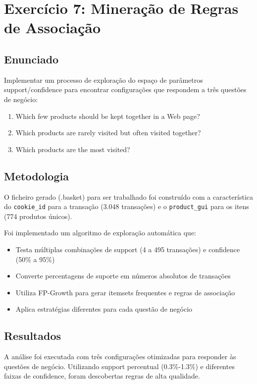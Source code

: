 \documentclass[11pt,a4paper]{article}
\begin{document}
\newpage

\section{Exercício 7: Mineração de Regras de Associação}

\subsection{Enunciado}

Implementar um processo de exploração do espaço de parâmetros support/confidence para encontrar configurações que respondem a três questões de negócio:
\begin{enumerate}
    \item Which few products should be kept together in a Web page?
    \item Which products are rarely visited but often visited together?
    \item Which products are the most visited?
\end{enumerate}

\subsection{Metodologia}

O ficheiro gerado (.basket) para ser trabalhado foi construído com a característica do \texttt{cookie\_id} para a transação (3.048 transações) e o \texttt{product\_gui} para os itens (774 produtos únicos). 

Foi implementado um algoritmo de exploração automática que:
\begin{itemize}
    \item Testa múltiplas combinações de support (4 a 495 transações) e confidence (50\% a 95\%)
    \item Converte percentagens de suporte em números absolutos de transações
    \item Utiliza FP-Growth para gerar itemsets frequentes e regras de associação
    \item Aplica estratégias diferentes para cada questão de negócio
\end{itemize}

\subsection{Resultados}

A análise foi executada com três configurações otimizadas para responder às questões de negócio. Utilizando support percentual (0.3\%-1.3\%) e diferentes faixas de confidence, foram descobertas regras de alta qualidade.
\end{document}
